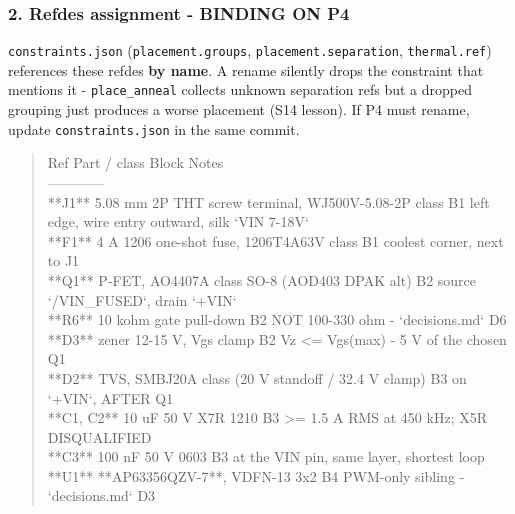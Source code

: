 \documentclass[11pt,a4paper]{article}
\begin{document}
\subsubsection*{2. Refdes assignment - BINDING ON P4}
\texttt{constraints.json} (\texttt{placement.groups}, \texttt{placement.separation}, \texttt{thermal.ref}) references these refdes \textbf{by name}. A rename silently drops the constraint that mentions it - \texttt{place\_anneal} collects unknown separation refs but a dropped grouping just produces a worse placement (S14 lesson). If P4 must rename, update \texttt{constraints.json} in the same commit.

\begin{quote}\small\ttfamily\raggedright
\textbar{} Ref \textbar{} Part / class \textbar{} Block \textbar{} Notes \textbar{}\\
\textbar{}---\textbar{}---\textbar{}---\textbar{}---\textbar{}\\
\textbar{} {*}{*}J1{*}{*} \textbar{} 5.08 mm 2P THT screw terminal, WJ500V-5.08-2P class \textbar{} B1 \textbar{} left edge, wire entry outward, silk `VIN 7-18V` \textbar{}\\
\textbar{} {*}{*}F1{*}{*} \textbar{} 4 A 1206 one-shot fuse, 1206T4A63V class \textbar{} B1 \textbar{} coolest corner, next to J1 \textbar{}\\
\textbar{} {*}{*}Q1{*}{*} \textbar{} P-FET, AO4407A class SO-8 (AOD403 DPAK alt) \textbar{} B2 \textbar{} source `/VIN\_FUSED`, drain `+VIN` \textbar{}\\
\textbar{} {*}{*}R6{*}{*} \textbar{} 10 kohm gate pull-down \textbar{} B2 \textbar{} NOT 100-330 ohm - `decisions.md` D6 \textbar{}\\
\textbar{} {*}{*}D3{*}{*} \textbar{} zener 12-15 V, Vgs clamp \textbar{} B2 \textbar{} Vz \textless{}= Vgs(max) - 5 V of the chosen Q1 \textbar{}\\
\textbar{} {*}{*}D2{*}{*} \textbar{} TVS, SMBJ20A class (20 V standoff / 32.4 V clamp) \textbar{} B3 \textbar{} on `+VIN`, AFTER Q1 \textbar{}\\
\textbar{} {*}{*}C1, C2{*}{*} \textbar{} 10 uF 50 V X7R 1210 \textbar{} B3 \textbar{} \textgreater{}= 1.5 A RMS at 450 kHz; X5R DISQUALIFIED \textbar{}\\
\textbar{} {*}{*}C3{*}{*} \textbar{} 100 nF 50 V 0603 \textbar{} B3 \textbar{} at the VIN pin, same layer, shortest loop \textbar{}\\
\textbar{} {*}{*}U1{*}{*} \textbar{} {*}{*}AP63356QZV-7{*}{*}, VDFN-13 3x2 \textbar{} B4 \textbar{} PWM-only sibling - `decisions.md` D3 \textbar{}\\

\end{quote}
\end{document}
